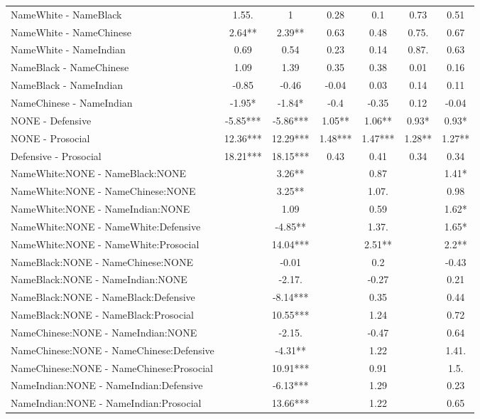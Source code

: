 \documentclass[]{report}
\begin{document}
\begin{table}
{\begin{tabular}[t]{lcccccc}
	NameWhite - NameBlack & 1.55. & 1 & 0.28 & 0.1 & 0.73 & 0.51 \\ 
	NameWhite - NameChinese & 2.64** & 2.39** & 0.63 & 0.48 & 0.75. & 0.67 \\ 
	NameWhite - NameIndian & 0.69 & 0.54 & 0.23 & 0.14 & 0.87. & 0.63 \\ 
	NameBlack - NameChinese & 1.09 & 1.39 & 0.35 & 0.38 & 0.01 & 0.16 \\ 
	NameBlack - NameIndian & -0.85 & -0.46 & -0.04 & 0.03 & 0.14 & 0.11 \\ 
	NameChinese - NameIndian & -1.95* & -1.84* & -0.4 & -0.35 & 0.12 & -0.04 \\ 
	NONE - Defensive & -5.85*** & -5.86*** & 1.05** & 1.06** & 0.93* & 0.93* \\ 
	NONE - Prosocial & 12.36*** & 12.29*** & 1.48*** & 1.47*** & 1.28** & 1.27** \\ 
	Defensive - Prosocial & 18.21*** & 18.15*** & 0.43 & 0.41 & 0.34 & 0.34 \\ 
	NameWhite:NONE - NameBlack:NONE &  & 3.26** &  & 0.87 &  & 1.41* \\ 
	NameWhite:NONE - NameChinese:NONE &  & 3.25** &  & 1.07. &  & 0.98 \\ 
	NameWhite:NONE - NameIndian:NONE &  & 1.09 &  & 0.59 &  & 1.62* \\ 
	NameWhite:NONE - NameWhite:Defensive &  & -4.85** &  & 1.37. &  & 1.65* \\ 
	NameWhite:NONE - NameWhite:Prosocial &  & 14.04*** &  & 2.51** &  & 2.2** \\ 
	NameBlack:NONE - NameChinese:NONE &  & -0.01 &  & 0.2 &  & -0.43 \\ 
	NameBlack:NONE - NameIndian:NONE &  & -2.17. &  & -0.27 &  & 0.21 \\ 
	NameBlack:NONE - NameBlack:Defensive &  & -8.14*** &  & 0.35 &  & 0.44 \\ 
	NameBlack:NONE - NameBlack:Prosocial &  & 10.55*** &  & 1.24 &  & 0.72 \\ 
	NameChinese:NONE - NameIndian:NONE &  & -2.15. &  & -0.47 &  & 0.64 \\ 
	NameChinese:NONE - NameChinese:Defensive &  & -4.31** &  & 1.22 &  & 1.41. \\ 
	NameChinese:NONE - NameChinese:Prosocial &  & 10.91*** &  & 0.91 &  & 1.5. \\ 
	NameIndian:NONE - NameIndian:Defensive &  & -6.13*** &  & 1.29 &  & 0.23 \\ 
	NameIndian:NONE - NameIndian:Prosocial &  & 13.66*** &  & 1.22 &  & 0.65 \\ 

\end{tabular}}
\end{table}
\end{document}
